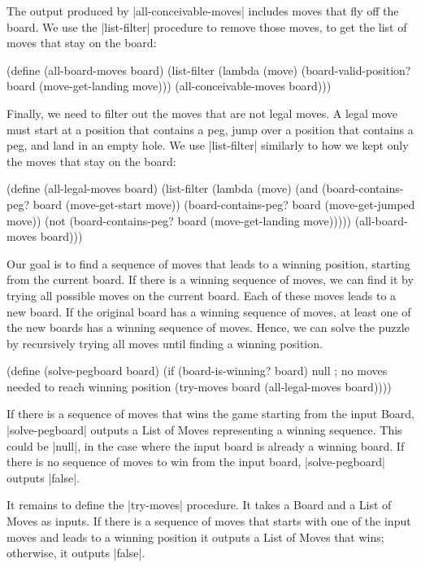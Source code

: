 \begin{schemeregion}
{The output produced by \scheme|all-conceivable-moves| includes moves that fly off the board.  We use the \scheme|list-filter| procedure to remove those moves, to get the list of moves that stay on the board:
\begin{schemedisplay}
(define (all-board-moves board)
  (list-filter 
   (lambda (move) (board-valid-position? board (move-get-landing move)))          
   (all-conceivable-moves board)))
\end{schemedisplay}
Finally, we need to filter out the moves that are not legal moves.  A legal move must start at a position that contains a peg, jump over a position that contains a peg, and land in an empty hole.  We use \scheme|list-filter| similarly to how we kept only the moves that stay on the board:
\begin{schemedisplay}
(define (all-legal-moves board)
  (list-filter
    (lambda (move)
      (and 
       (board-contains-peg? board (move-get-start move))
       (board-contains-peg? board (move-get-jumped move))
       (not (board-contains-peg? board (move-get-landing move)))))
   (all-board-moves board)))
\end{schemedisplay}

Our goal is to find a sequence of moves that leads to a winning position, starting from the current board.  If there is a winning sequence of moves, we can find it by trying all possible moves on the current board.  Each of these moves leads to a new board.  If the original board has a winning sequence of moves, at least one of the new boards has a winning sequence of moves.  Hence, we can solve the puzzle by recursively trying all moves until finding a winning position.
\begin{schemedisplay}
(define (solve-pegboard board)
  (if (board-is-winning? board)
      null ; no moves needed to reach winning position
      (try-moves board (all-legal-moves board))))
\end{schemedisplay}
If there is a sequence of moves that wins the game starting from the input Board, \scheme|solve-pegboard| outputs a List of Moves representing a winning sequence.  This could be \schemeresult|null|, in the case where the input board is already a winning board.  If there is no sequence of moves to win from the input board, \scheme|solve-pegboard| outputs \schemeresult|false|.

It remains to define the \scheme|try-moves| procedure.  It takes a Board and a List of Moves as inputs.  If there is a sequence of moves that starts with one of the input moves and leads to a winning position it outputs a List of Moves that wins; otherwise, it outputs \schemeresult|false|.

}
\end{schemeregion}
